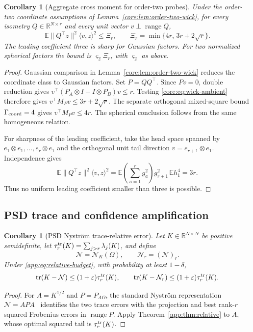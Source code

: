 \documentclass[11pt,a4paper]{article}
\newtheorem{corollary}[theorem]{Corollary}
\theoremstyle{definition}\newtheorem{definition}[theorem]{Definition}
\theoremstyle{remark}\newtheorem{remark}[theorem]{Remark}
\numberwithin{equation}{section}
\newcommand{\R}{\mathbb R}\newcommand{\E}{\mathbb E}\newcommand{\Pp}{\mathbb P}
\newcommand{\norm}[1]{\lVert#1\rVert}\newcommand{\ip}[2]{\langle#1,#2\rangle}
\DeclareMathOperator{\tr}{tr}\DeclareMathOperator{\rank}{rank}
\DeclareMathOperator{\range}{range}\DeclareMathOperator{\diag}{diag}
\begin{document}
\begin{corollary}[Aggregate cross moment for order-two probes]
\label{app:cor:order-two-cross}
Under the order-two coordinate assumptions of
Lemma~\ref{core:lem:order-two-wick}, for every isometry
$Q\in\R^{N\times r}$ and every unit vector $v\perp\range Q$,
\begin{equation}\label{app:eq:order-two-cross}
 \E\norm{Q^\top z}^2\ip vz^2\le\Xi_r,\qquad
 \Xi_r=\min\{4r,\,3r+2\sqrt r\}.
\end{equation}
The leading coefficient three is sharp for Gaussian factors.
For two normalized spherical factors the bound is
$\varsigma_2\Xi_r$, with $\varsigma_2$ as above.
\end{corollary}
\begin{proof}
Gaussian comparison in Lemma~\ref{core:lem:order-two-wick} reduces
the coordinate class to Gaussian factors. Set $P=QQ^\top$.
Since $Pv=0$, double reduction gives
$v^\top(P_A\otimes I+I\otimes P_B)v\le r$.
Testing \eqref{core:eq:wick-ambient} therefore gives
$v^\top M_Pv\le3r+2\sqrt r$.
The separate orthogonal mixed-square bound
$\Gamma_{\rm coord}=4$ gives $v^\top M_Pv\le4r$.
The spherical conclusion follows from the same homogeneous relation.

For sharpness of the leading coefficient, take the head space
spanned by $e_1\otimes e_1,\ldots,e_r\otimes e_1$ and the orthogonal
unit tail direction $v=e_{r+1}\otimes e_1$. Independence gives
\[
 \E\norm{Q^\top z}^2\ip vz^2
 =\E\left(\sum_{a=1}^r g_a^2\right)g_{r+1}^2\,\E h_1^4
 =3r.
\]
Thus no uniform leading coefficient smaller than three is possible.
\end{proof}

\subsection{PSD trace and confidence amplification}
\label{appendix:amplification}
\begin{corollary}[PSD Nystr\"om trace-relative error]
\label{app:cor:nystrom}
Let $K\in\R^{N\times N}$ be positive semidefinite, let
$\tau_r^{\rm tr}(K)=\sum_{j>r}\lambda_j(K)$, and define
\[
 \mathcal N=\mathcal N_K(\Omega),\qquad \mathcal N_r=(\mathcal N)_r.
\]
Under \eqref{app:eq:relative-budget}, with probability at least $1-\delta$,
\begin{equation}\label{app:eq:nystrom-relative}
 \tr(K-\mathcal N)\le(1+\varepsilon)\tau_r^{\rm tr}(K),\qquad
 \tr(K-\mathcal N_r)\le(1+\varepsilon)\tau_r^{\rm tr}(K).
\end{equation}
\end{corollary}
\begin{proof}
For $A=K^{1/2}$ and $P=P_{A\Omega}$, the standard Nystr\"om
representation $\mathcal N=APA$~\cite[Proposition~A.2]{TYUCPSD2017}
identifies the two trace errors with the projection and best rank-$r$
squared Frobenius errors in $\range P$. Apply Theorem~\ref{app:thm:relative}
to $A$, whose optimal squared tail is $\tau_r^{\rm tr}(K)$.
\end{proof}
\end{document}
